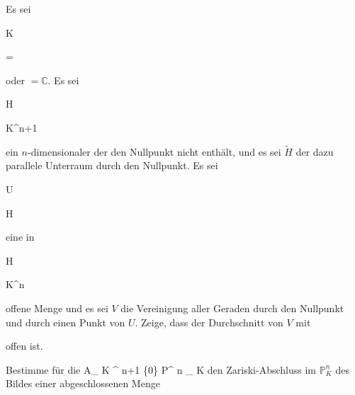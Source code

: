 {


Es sei


\mavergleichskette

{\vergleichskette

{ {\mathbb K}
}

{ = }{ \R
}

{  }{
}

{    }{
}

{   }{
}

}
{}{}{}
oder $= {\mathbb C}$. Es sei


\mavergleichskette

{\vergleichskette

{ H
}

{ \subset }{ {\mathbb K}^{n+1}
}

{  }{
}

{    }{
}

{   }{
}

}
{}{}{}
ein $n$-dimensionaler
der den Nullpunkt nicht enthält, und es sei $\tilde{H}$ der dazu parallele Unterraum durch den Nullpunkt. Es sei


\mavergleichskette

{\vergleichskette

{ U
}

{ \subseteq }{ H
}

{  }{
}

{    }{
}

{   }{
}

}
{}{}{}
eine in


\mavergleichskette

{\vergleichskette

{ H
}

{ \cong }{ {\mathbb K}^n
}

{  }{
}

{    }{
}

{   }{
}

}
{}{}{}
offene Menge
 {} {}
und es sei $V$ die Vereinigung aller Geraden durch den Nullpunkt und durch einen Punkt von $U$. Zeige, dass der Durchschnitt von $V$ mit

 offen ist.


}

{} {}



{}

{


Bestimme für die
\maabbdisp {} { { {\mathbb A}_{  K  }^{ n+1  } } \setminus \{0\}} { {\mathbb P}^{ n }_{ K }
} {}
den Zariski-Abschluss im ${\mathbb P}^{ n }_{ K }$ des Bildes einer abgeschlossenen Menge



}

